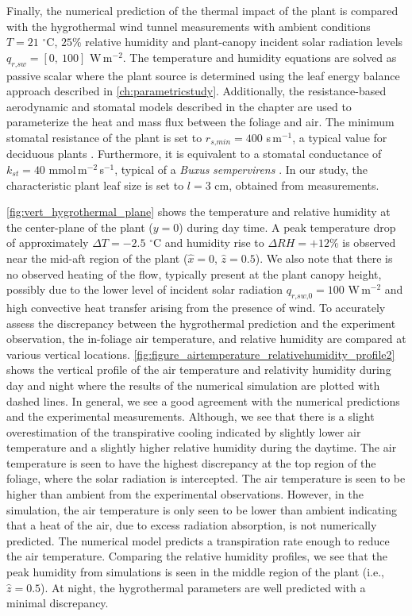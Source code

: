 Finally, the numerical prediction of the thermal impact of the plant is compared with the hygrothermal wind tunnel measurements with ambient conditions $T = 21$ $^{\circ}$C, $25$\% relative humidity and plant-canopy incident solar radiation levels $q_{\textit{r,sw}} = \left[0,\ 100\right]$ W\,m$^{-2}$. The temperature and humidity equations are solved as passive scalar where the plant source is determined using the leaf energy balance approach described in \cref{ch:parametricstudy}. Additionally, the resistance-based aerodynamic and stomatal models described in the chapter are used to parameterize the heat and mass flux between the foliage and air. The minimum stomatal resistance of the plant is set to $r_{\textit{s,min}} = 400$ s\,m$^{-1}$, a typical value for deciduous plants \citep{Baille1994,Bruse1998}. Furthermore, it is equivalent to a stomatal conductance of $k_{\textit{st}} = 40$ mmol\,m$^{-2}$\,s$^{-1}$, typical of a \textit{Buxus} \textit{sempervirens} \citep{Rodriguez-Calcerrada2013a,Letts2012}. In our study, the characteristic plant leaf size is set to $l=3$ cm, obtained from measurements.

\cref{fig:vert_hygrothermal_plane} shows the temperature and relative humidity at the center-plane of the plant ($y=0$) during day time. A peak temperature drop of approximately $\Delta T = -2.5$ $^{\circ}$C and humidity rise to $\Delta RH = +12$\% is observed near the mid-aft region of the plant ($\hat{x} = 0$, $\hat{z} = 0.5$). We also note that there is no observed heating of the flow, typically present at the plant canopy height, possibly due to the lower level of incident solar radiation $q_{\textit{r,sw,0}} = 100$ W\,m$^{-2}$ and high convective heat transfer arising from the presence of wind. To accurately assess the discrepancy between the hygrothermal prediction and the experiment observation, the in-foliage air temperature, and relative humidity are compared at various vertical locations. \cref{fig:figure_airtemperature_relativehumidity_profile2} shows the vertical profile of the air temperature and relativity humidity during day and night where the results of the numerical simulation are plotted with dashed lines. In general, we see a good agreement with the numerical predictions and the experimental measurements. Although, we see that there is a slight overestimation of the transpirative cooling indicated by slightly lower air temperature and a slightly higher relative humidity during the daytime. The air temperature is seen to have the highest discrepancy at the top region of the foliage, where the solar radiation is intercepted. The air temperature is seen to be higher than ambient from the experimental observations. However, in the simulation, the air temperature is only seen to be lower than ambient indicating that a heat of the air, due to excess radiation absorption, is not numerically predicted. The numerical model predicts a transpiration rate enough to reduce the air temperature. Comparing the relative humidity profiles, we see that the peak humidity from simulations is seen in the middle region of the plant (i.e., $\hat{z}=0.5$). At night, the hygrothermal parameters are well predicted with a minimal discrepancy. 


